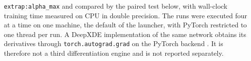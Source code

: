 \texttt{extrap:alpha\_max} and compared by the paired test below, with wall-clock
training time measured on CPU in double precision. The runs were executed four at a
time on one machine, the default of the launcher, with PyTorch restricted to one thread
per run.
A DeepXDE implementation of the same network obtains its derivatives through
\texttt{torch.autograd.grad} on the PyTorch backend \citep{lu2021}. It is therefore not a third
differentiation engine and is not reported separately.

